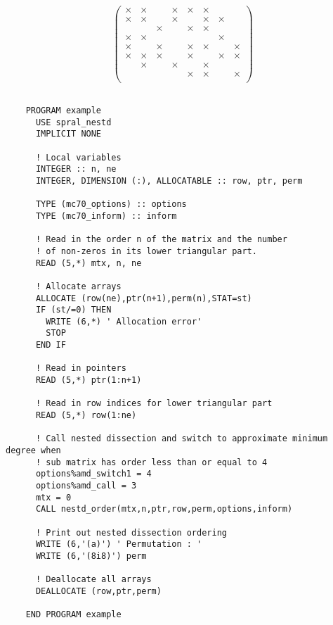 $$
	\left(\begin{array}{cccccccc}
   \times &  \times  &         &  \times  &  \times  & \times &          &           \\
   \times &  \times  &         &  \times  &          & \times &  \times  &           \\ 
          &          & \times  &          &  \times  & \times &          &           \\
   \times &  \times  &         &          &          &        &  \times  &           \\ 
   \times &          & \times  &          &  \times  & \times &          &   \times  \\ 
   \times &  \times  & \times  &          &  \times  &        &  \times  &   \times  \\ 
          &  \times  &         &  \times  &          & \times &          &           \\ 
          &          &         &          &  \times  & \times &          &   \times  \\ 
	\end{array}\right)
$$


\smallskip

\def\baselinestretch{0.8}
{\small \begin{verbatim}

    PROGRAM example
      USE spral_nestd
      IMPLICIT NONE

      ! Local variables
      INTEGER :: n, ne
      INTEGER, DIMENSION (:), ALLOCATABLE :: row, ptr, perm

      TYPE (mc70_options) :: options
      TYPE (mc70_inform) :: inform

      ! Read in the order n of the matrix and the number
      ! of non-zeros in its lower triangular part.
      READ (5,*) mtx, n, ne

      ! Allocate arrays
      ALLOCATE (row(ne),ptr(n+1),perm(n),STAT=st)
      IF (st/=0) THEN
        WRITE (6,*) ' Allocation error'
        STOP
      END IF

      ! Read in pointers
      READ (5,*) ptr(1:n+1)

      ! Read in row indices for lower triangular part
      READ (5,*) row(1:ne)

      ! Call nested dissection and switch to approximate minimum degree when
      ! sub matrix has order less than or equal to 4
      options%amd_switch1 = 4
      options%amd_call = 3
      mtx = 0
      CALL nestd_order(mtx,n,ptr,row,perm,options,inform)

      ! Print out nested dissection ordering
      WRITE (6,'(a)') ' Permutation : '
      WRITE (6,'(8i8)') perm

      ! Deallocate all arrays
      DEALLOCATE (row,ptr,perm)

    END PROGRAM example
\end{verbatim}  }
\def\baselinestretch{1.0}
\medskip

